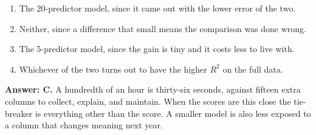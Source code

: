 \documentclass[11pt]{article}
\begin{document}
\begin{enumerate}[itemsep=14pt]
\begin{enumerate}[label=\Alph*., itemsep=1pt, topsep=3pt]
  \item The 20-predictor model, since it came out with the lower error of the two.
  \item Neither, since a difference that small means the comparison was done wrong.
  \item The 5-predictor model, since the gain is tiny and it costs less to live with.
  \item Whichever of the two turns out to have the higher $R^2$ on the full data.
\end{enumerate}

\vspace{2pt}
\textbf{Answer: C.} A hundredth of an hour is thirty-six seconds, against fifteen extra columns to collect, explain, and maintain. When the scores are this close the tie-breaker is everything other than the score. A smaller model is also less exposed to a column that changes meaning next year.
\vspace{4pt}

\end{enumerate}
\end{document}

